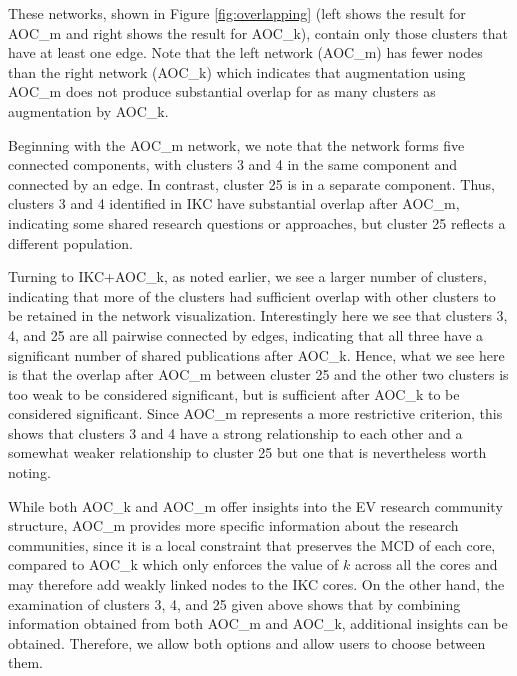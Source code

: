 \documentclass[12pt, oneside]{article}   	%
\begin{document}
These networks, shown in Figure \ref{fig:overlapping} (left shows the result for AOC\_m and right shows the result for AOC\_k), contain only those clusters that have at least
one edge. Note that  the left network (AOC\_m) has fewer nodes than the right network (AOC\_k) which indicates that augmentation using AOC\_m does not produce substantial 
overlap for as many clusters as augmentation by AOC\_k.

Beginning with the AOC\_m network, we note that the network forms five connected components, with clusters 3 and 4  in the same component and connected by an edge.
In contrast, cluster 25 is in a separate component. Thus, clusters 3 and 4 identified in IKC have substantial overlap after AOC\_m, indicating some shared research questions or approaches, but
cluster 25 reflects a different population. 

Turning to IKC+AOC\_k,  as noted earlier, we see a larger number of clusters, indicating that more of the clusters had sufficient overlap with other clusters to be retained in the network visualization. 
Interestingly here we see that clusters 3, 4, and 25 are all pairwise connected by edges, indicating that all three have a significant number of shared publications after AOC\_k. 
Hence,  what we see here is that the overlap after AOC\_m between cluster 25 and the other two clusters is too weak to be considered significant, but is sufficient  after AOC\_k to be considered significant.
Since AOC\_m represents a more restrictive criterion, this shows that clusters 3 and 4 have a strong relationship  to each other and a somewhat weaker relationship to cluster 25 but one that is nevertheless worth noting.  


While both AOC\_k and AOC\_m offer insights into the EV research community structure,   AOC\_m provides more specific information about the research communities, since it is a local constraint that preserves the MCD of each core, compared to AOC\_k which only enforces the value of $k$ across all the cores and may therefore add weakly linked nodes to the IKC cores. 
On the other hand, the examination of clusters 3, 4, and 25 given above shows that by combining information obtained from both AOC\_m and AOC\_k, additional insights can be obtained.  
Therefore, we allow both options and allow users to choose between them.
\end{document}
